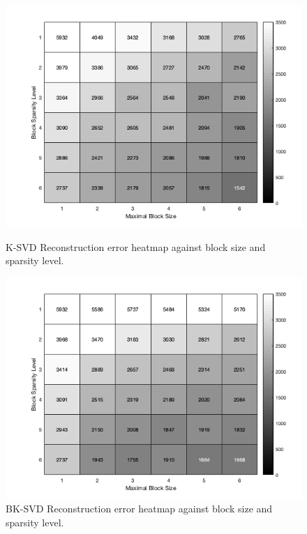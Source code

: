 \begin{figure}[!htbp]
\centering
\begin{minipage}[]{0.49\textwidth}
\includegraphics[width=\textwidth]{images/ksvd_heat.png}
\caption{K-SVD Reconstruction error heatmap against block size and sparsity level.}
\label{HEAT1}
\end{minipage}
\begin{minipage}[]{0.49\textwidth}
\includegraphics[width=\textwidth]{images/bksvd_heat.png}
\caption{BK-SVD Reconstruction error heatmap against block size and sparsity level.}
\label{HEAT2}
\end{minipage}
\end{figure}
